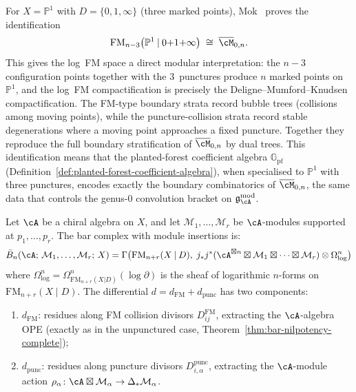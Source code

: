 \begin{example}
\label{ex:log-fm-moduli-rational}
For $X = \mathbb{P}^1$ with $D = \{0, 1, \infty\}$ (three marked points),
Mok~\cite[\S3.4.1]{Mok25} proves the identification
\begin{equation}\label{eq:log-fm-m0n}
\operatorname{FM}_{n-3}\bigl(\mathbb{P}^1 \mathbin{|}
  0{+}1{+}\infty\bigr)
\;\cong\;
\overline{\cM}_{0,n}.
\end{equation}
This gives the log~FM space a direct modular interpretation:
the $n-3$ configuration points together with the $3$~punctures
produce $n$ marked points on~$\mathbb{P}^1$, and the log~FM
compactification is precisely the Deligne--Mumford--Knudsen
compactification.  The FM-type boundary strata record
bubble trees (collisions among moving points), while the
puncture-collision strata record stable degenerations where a
moving point approaches a fixed puncture.  Together they
reproduce the full boundary stratification of
$\overline{\cM}_{0,n}$ by dual trees.
This identification means that the planted-forest coefficient
algebra $\mathbb{G}_{\mathrm{pf}}$
(Definition~\ref{def:planted-forest-coefficient-algebra}),
when specialised to $\mathbb{P}^1$ with three punctures, encodes
exactly the boundary combinatorics of
$\overline{\cM}_{0,n}$, the same data that controls the
genus-$0$ convolution bracket on
$\mathfrak{g}^{\mathrm{mod}}_\cA$.
\end{example}

\begin{theorem}
\label{thm:bar-punctured-curve}
Let $\cA$ be a chiral algebra on $X$, and let
$\mathcal{M}_1, \ldots, \mathcal{M}_r$ be $\cA$-modules
supported at $p_1, \ldots, p_r$.  The bar complex with module
insertions is:
\begin{equation}\label{eq:bar-punctured}
\bar{B}_n(\cA;\, \mathcal{M}_1, \ldots, \mathcal{M}_r;\, X)
= \Gamma\bigl(\mathrm{FM}_{n+r}(X \mathbin{|} D),\;
  j_* j^*(\cA^{\boxtimes n}
  \boxtimes \mathcal{M}_1 \boxtimes \cdots
  \boxtimes \mathcal{M}_r)
  \otimes \Omega^n_{\log}\bigr)
\end{equation}
where $\Omega^n_{\log} = \Omega^n_{\mathrm{FM}_{n+r}(X|D)}
(\log \partial)$ is the sheaf of logarithmic $n$-forms
on $\mathrm{FM}_{n+r}(X \mathbin{|} D)$.
The differential
$d = d_{\mathrm{FM}} + d_{\mathrm{punc}}$
has two components:
\begin{enumerate}[label=\textup{(\alph*)}]
\item $d_{\mathrm{FM}}$: residues along FM collision divisors
  $D_{ij}^{\mathrm{FM}}$, extracting the $\cA$-algebra OPE
  \textup{(}exactly as in the unpunctured
  case, Theorem~\textup{\ref{thm:bar-nilpotency-complete})};
\item $d_{\mathrm{punc}}$: residues along puncture divisors
  $D_{i,\alpha}^{\mathrm{punc}}$, extracting the
  $\cA$-module action $\rho_\alpha\colon \cA \boxtimes
  \mathcal{M}_\alpha \to \Delta_* \mathcal{M}_\alpha$.
\end{enumerate}
\end{theorem}

